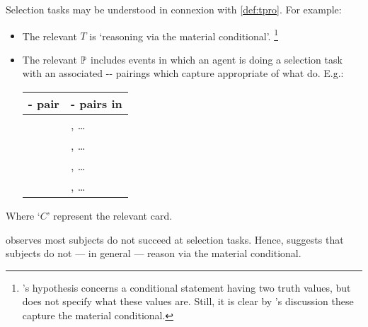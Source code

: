 \begin{note}
  Selection tasks may be understood in connexion with \autoref{def:tpro}.
  For example:
  \begin{itemize}
  \item
    The relevant \tocN{} \(T\) is `reasoning via the material conditional'.%
    \footnote{
      \citeauthor{Wason:1966aa}'s hypothesis concerns a conditional statement having two truth values, but does not specify what these values are.
      Still, it is clear by \citeauthor{Wason:1966aa}'s discussion these capture the material conditional.
    }
  \item
    The relevant \tpro{} \(\mathbb{P}\) includes events in which an agent is doing a selection task with an associated -- pairings which capture appropriate  of what do.
    E.g.:
    \begin{center}
      \begin{tabular}{R{.40\textwidth} L{.40\textwidth}}
        - pair & - pairs in  \\
        \hline
         & , \dots \\
         & , \dots \\
         & , \dots \\
         & , \dots \\
      \end{tabular}
    \end{center}
  \end{itemize}
  Where `\(C\)' represent the relevant card.
\end{note}


\begin{note}
  \citeauthor{Wason:1966aa} observes most subjects do not succeed at selection tasks.
  Hence, \citeauthor{Wason:1966aa} suggests that subjects do not --- in general --- reason via the material conditional.
\end{note}


